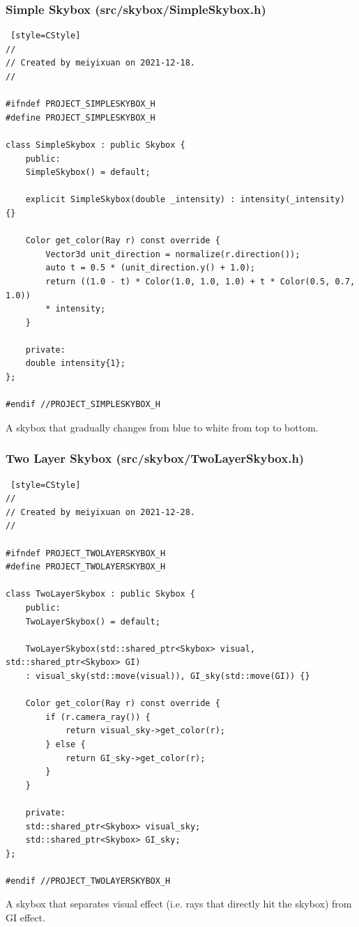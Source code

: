 \documentclass[utf8]{article}
\begin{document}
\subsubsection{Simple Skybox (src/skybox/SimpleSkybox.h)}
\begin{lstlisting} [style=CStyle]
//
// Created by meiyixuan on 2021-12-18.
//

#ifndef PROJECT_SIMPLESKYBOX_H
#define PROJECT_SIMPLESKYBOX_H

class SimpleSkybox : public Skybox {
	public:
	SimpleSkybox() = default;
	
	explicit SimpleSkybox(double _intensity) : intensity(_intensity) {}
	
	Color get_color(Ray r) const override {
		Vector3d unit_direction = normalize(r.direction());
		auto t = 0.5 * (unit_direction.y() + 1.0);
		return ((1.0 - t) * Color(1.0, 1.0, 1.0) + t * Color(0.5, 0.7, 1.0))
		* intensity;
	}
	
	private:
	double intensity{1};
};

#endif //PROJECT_SIMPLESKYBOX_H

\end{lstlisting}
A skybox that gradually changes from blue to white from top to bottom.

\subsubsection{Two Layer Skybox (src/skybox/TwoLayerSkybox.h)}
\begin{lstlisting} [style=CStyle]
//
// Created by meiyixuan on 2021-12-28.
//

#ifndef PROJECT_TWOLAYERSKYBOX_H
#define PROJECT_TWOLAYERSKYBOX_H

class TwoLayerSkybox : public Skybox {
	public:
	TwoLayerSkybox() = default;
	
	TwoLayerSkybox(std::shared_ptr<Skybox> visual, std::shared_ptr<Skybox> GI)
	: visual_sky(std::move(visual)), GI_sky(std::move(GI)) {}
	
	Color get_color(Ray r) const override {
		if (r.camera_ray()) {
			return visual_sky->get_color(r);
		} else {
			return GI_sky->get_color(r);
		}
	}
	
	private:
	std::shared_ptr<Skybox> visual_sky;
	std::shared_ptr<Skybox> GI_sky;
};

#endif //PROJECT_TWOLAYERSKYBOX_H

\end{lstlisting}
A skybox that separates visual effect (i.e. rays that directly hit the skybox) from GI effect.
\end{document}
